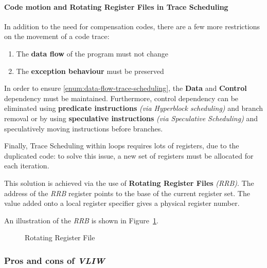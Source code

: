 \documentclass[english]{article}
\begin{document}
\paragraph{Code motion and Rotating Register Files in Trace Scheduling}

In addition to the need for compensation codes, there are a few more restrictions on the movement of a code trace:

\begin{enumerate}[label=\Alph*), ref=(\Alph*)]
  \item \label{enum:data-flow-trace-scheduling} The \textbf{data flow} of the program must not change
  \item \label{enum:exception-behaviour-trace-scheduling} The \textbf{exception behaviour} must be preserved
\end{enumerate}

\bigskip

In order to ensure \ref{enum:data-flow-trace-scheduling}, the \textbf{Data} and \textbf{Control} dependency must be maintained.
Furthermore, control dependency can be eliminated using \textbf{predicate instructions} \textit{(via Hyperblock scheduling) }and branch removal or by using \textbf{speculative instructions} \textit{(via Speculative Scheduling)} and speculatively moving instructions before branches.

Finally, Trace Scheduling within loops requires lots of registers, due to the duplicated code:
to solve this issue, a new set of registers must be allocated for each iteration.

This solution is achieved via the use of \textbf{Rotating Register Files} \textit{(RRB)}.
The address of the \textit{RRB} register points to the base of the current register set.
The value added onto a local register specifier gives a physical register number.

\bigskip
An illustration of the \textit{RRB} is shown in Figure~\ref{fig:rotating-register-file}.

\begin{figure}[htbp]
  \bigskip
  \centering
  \caption{Rotating Register File}
  \label{fig:rotating-register-file}
  \bigskip
\end{figure}

\subsubsection{Pros and cons of \textit{VLIW}}
\end{document}
